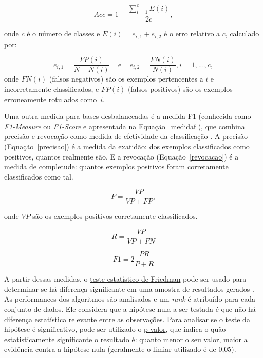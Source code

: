     \begin{equation}
      Acc = 1 - \frac{\sum_{i=1}^{c} E(i)}{2c},
    \label{eq:Accuracy}
    \end{equation}

    \noindent onde $c$ é o número de classes e $E(i) = e_{i,1} + e_{i,2}$ é o erro relativo a $c$, calculado por:

    \begin{equation*}
      e_{i,1} = \frac{FP(i)}{N-N(i)} \,\,\,\,\, \text{ e } \,\,\,\,\, e_{i,2} = \frac{FN(i)}{N(i)}, i=1,...,c,
    \label{eq:Errors}
    \end{equation*}
   \noindent onde $FN(i)$ (falsos negativos) são os exemplos pertencentes a $i$ e incorretamente classificados, e $FP(i)$ (falsos positivos) são os exemplos erroneamente rotulados como~$i$.


Uma outra medida para bases desbalanceadas é a \underline{medida-F1} (conhecida como \textit{F1-Measure} ou \textit{F1-Score} e apresentada na Equação~\eqref{medidaf}), que combina precisão e revocação como medida de efetividade da classificação \cite{Garcia2009}.
A precisão (Equação~\ref{precisao}) é a medida da exatidão: dos exemplos classificados como positivos, quantos realmente são. E a revocação (Equação~\ref{revocacao}) é a medida de completude: quantos exemplos positivos foram corretamente classificados como tal.

\begin{equation}
  P = \frac{VP}{VP + FP},
  \label{precisao}
\end{equation}

\noindent onde $VP$ são os exemplos positivos corretamente classificados.

\begin{equation}
  R = \frac{VP}{VP + FN}
  \label{revocacao}
\end{equation}

\begin{equation}
  F1 = 2 \frac{PR}{P+R}
  \label{medidaf}
\end{equation}

A partir dessas medidas, o \underline{teste estatístico de Friedman} pode ser usado para determinar se há diferença significante em uma amostra de resultados gerados \cite{friedman2010}. As performances dos algoritmos são analisados e um \textit{rank} é atribuído para cada conjunto de dados. Ele considera que a hipótese nula a ser testada é que não há diferença estatística relevante entre as observações. Para analisar se o teste da hipótese é significativo, pode ser utilizado o \underline{p-valor}, que indica o quão estatisticamente significante o resultado é: quanto menor o seu valor, maior a evidência contra a hipótese nula (geralmente o limiar utilizado é de 0,05).

